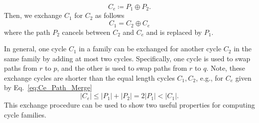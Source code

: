 \documentclass[fleqn,11pt]{article}
\newcommand\RelCyc{\mathcal{C_R}} %
\begin{document}
\begin{equation}
	C_e \coloneq P_1\oplus P_2.\label{eq:Ce_Path_Merge}
\end{equation}
Then, we exchange $C_1$ for $C_2$ as follows
\begin{equation}
	C_1 = C_2 \oplus C_e\label{eq:Ce_Ex_Vis}
\end{equation}
where the path $P_2$ cancels between $C_2$ and $C_e$ and is replaced by $P_1$. %

In general, one cycle $C_1$ in a family can be exchanged for another cycle $C_2$ in the same family by adding at most two cycles. Specifically, one cycle is used to swap paths from $r$ to $p$, and the other is used to swap paths from $r$ to $q$. Note, these exchange cycles are shorter than the equal length cycles $C_1,C_2$, e.g., for $C_e$ given by Eq.~\eqref{eq:Ce_Path_Merge}
\begin{equation}
	|C_e|\le |P_1|+|P_2|=2|P_1|<|C_1|.\label{eq:Ce_Ex_Len}
\end{equation}
This exchange procedure can be used to show two useful properties for computing cycle families.
\end{document}
